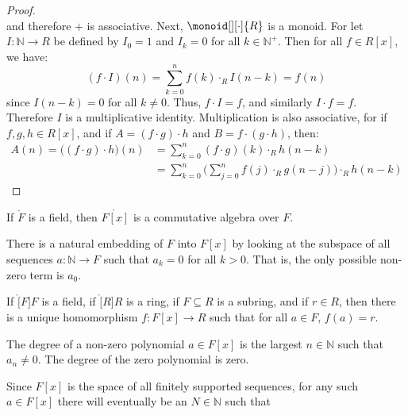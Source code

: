 \begin{proof}
\begin{subequations}
        \end{subequations}
        and therefore $+$ is associative. Next, $\monoid[][\cdot]{R}$ is a
        monoid. For let $I:\mathbb{N}\rightarrow{R}$ be defined
        by $I_{0}=1$ and $I_{k}=0$ for all $k\in\mathbb{N}^{+}$. Then for
        all $f\in{R}[x]$, we have:
        \begin{equation}
            (f\cdot{I})(n)=\sum_{k=0}^{n}f(k)\cdot_{R}I(n-k)
            =f(n)
        \end{equation}
        since $I(n-k)=0$ for all $k\ne{0}$. Thus, $f\cdot{I}=f$, and
        similarly $I\cdot{f}=f$. Therefore $I$ is a multiplicative identity.
        Multiplication is also associative, for if $f,g,h\in{R}[x]$, and if
        $A=(f\cdot{g})\cdot{h}$ and $B=f\cdot(g\cdot{h})$, then:
        \begin{subequations}
            \begin{align}
                A(n)=\big((f\cdot{g})\cdot{h}\big)(n)
                &=\sum_{k=0}^{n}(f\cdot{g})(k)\cdot_{R}h(n-k)\\
                &=\sum_{k=0}^{n}\Big(\sum_{j=0}^{n}f(j)\cdot_{R}g(n-j)\Big)
                    \cdot_{R}h(n-k)
            \end{align}
        \end{subequations}
    \end{proof}
    \begin{theorem}
        If $\ring{F}$ is a field, then $\ring{F[x]}$ is a commutative
        algebra over $F$.
    \end{theorem}
    There is a natural embedding of $F$ into $F[x]$ by looking at the
    subspace of all sequences $a:\mathbb{N}\rightarrow{F}$ such that
    $a_{k}=0$ for all $k>0$. That is, the only possible non-zero term is
    $a_{0}$.
    \begin{theorem}
        If $\ring[F]{F}$ is a field, if $\ring[R]{R}$ is a ring, if
        $F\subseteq{R}$ is a subring, and if $r\in{R}$, then there is a
        unique homomorphism $f:F[x]\rightarrow{R}$ such that for all
        $a\in{F}$, $f(a)=r$.
    \end{theorem}
    \begin{definition}
        The degree of a non-zero polynomial $a\in{F}[x]$ is the largest
        $n\in\mathbb{N}$ such that $a_{n}\ne{0}$. The degree of the zero
        polynomial is zero.
    \end{definition}
    Since $F[x]$ is the space of all finitely supported sequences, for any
    such $a\in{F}[x]$ there will eventually be an $N\in\mathbb{N}$ such that
